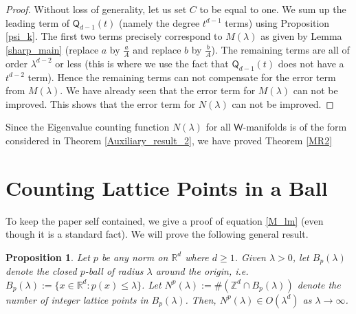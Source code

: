 \documentclass[11pt,lettersize,reqno,fullpage]{amsart}
\newtheorem{prp}[thm]{Proposition}
\begin{document}
\begin{proof} Without loss of generality, let us set $C$ to be equal to one.  
We sum up the leading term of $\mathsf{Q}_{d-1}(t)$ 
(namely the degree $t^{d-1}$ terms) using Proposition \ref{psi_k}. 
The first two terms precisely correspond to $M(\lambda)$ as given by 
Lemma \ref{sharp_main} (replace $a$ by $\frac{a}{A}$ and replace $b$ by $\frac{b}{A}$). 
The remaining terms are all of order $\lambda^{d-2}$ or less 
(this is where we use the fact that $\mathsf{Q}_{d-1}(t)$ does not have a $t^{d-2}$ term). 
Hence the remaining terms can not compensate 
for the error term from $M(\lambda)$. We have already seen that the error term for $M(\lambda)$ 
can not be improved. This shows that the error term for $N(\lambda)$ can not be improved.  
\end{proof}

Since the Eigenvalue counting function $N(\lambda)$ 
for all $\mathsf{W}$-manifolds is of the form 
considered in Theorem \ref{Auxiliary_result_2}, we have proved Theorem \ref{MR2} 

	
\section{Counting Lattice Points in a Ball}
\label{ball_std}
To keep the paper self contained, 
we give a proof of  
equation \eqref{M_lm} (even though it is a standard fact). 
We will prove the following general result.  
\begin{prp}
\label{lattice_count}
Let $p$ be any norm on $\mathbb{R}^d$ where $d \geq 1$. Given $\lambda > 0$,  let $B_p(\lambda)$ denote the closed $p$-ball of radius $\lambda$ around the origin, i.e.  \(B_p(\lambda) := \{x \in \mathbb{R}^d : p(x) \leq \lambda\}\). 
Let \(N^p(\lambda) := \#(\mathbb{Z}^d \cap B_p(\lambda))\) denote 
the number of integer lattice points in $B_p(\lambda)$.  
Then, $N^p(\lambda) \in O(\lambda^d)$ as $\lambda \to \infty$.
\end{prp}
\end{document}
